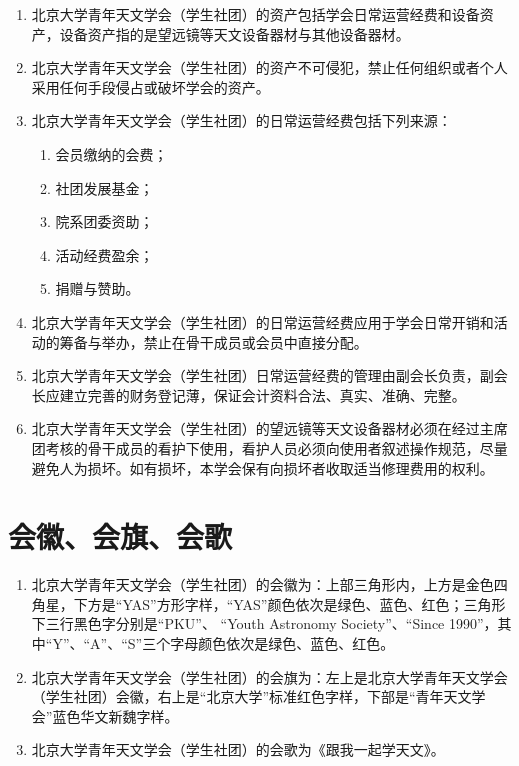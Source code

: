 \begin{enumerate}[resume]
    \item 北京大学青年天文学会（学生社团）的资产包括学会日常运营经费和设备资产，设备资产指的是望远镜等天文设备器材与其他设备器材。
    
    \item 北京大学青年天文学会（学生社团）的资产不可侵犯，禁止任何组织或者个人采用任何手段侵占或破坏学会的资产。
    
    \item 北京大学青年天文学会（学生社团）的日常运营经费包括下列来源：
    
    \begin{enumerate}
        \item 会员缴纳的会费；
        \item 社团发展基金；
        \item 院系团委资助；
        \item 活动经费盈余；
        \item 捐赠与赞助。
    \end{enumerate}
    
    \item 北京大学青年天文学会（学生社团）的日常运营经费应用于学会日常开销和活动的筹备与举办，禁止在骨干成员或会员中直接分配。
    
    \item 北京大学青年天文学会（学生社团）日常运营经费的管理由副会长负责，副会长应建立完善的财务登记薄，保证会计资料合法、真实、准确、完整。
    
    \item 北京大学青年天文学会（学生社团）的望远镜等天文设备器材必须在经过主席团考核的骨干成员的看护下使用，看护人员必须向使用者叙述操作规范，尽量避免人为损坏。如有损坏，本学会保有向损坏者收取适当修理费用的权利。
\end{enumerate}

\section{会徽、会旗、会歌}

\begin{enumerate}[resume]
    \item 北京大学青年天文学会（学生社团）的会徽为：上部三角形内，上方是金色四角星，下方是“YAS”方形字样，“YAS”颜色依次是绿色、蓝色、红色；三角形下三行黑色字分别是“PKU”、 “Youth Astronomy Society”、“Since 1990”，其中“Y”、“A”、“S”三个字母颜色依次是绿色、蓝色、红色。
    
    \item 北京大学青年天文学会（学生社团）的会旗为：左上是北京大学青年天文学会（学生社团）会徽，右上是“北京大学”标准红色字样，下部是“青年天文学会”蓝色华文新魏字样。
    
    \item 北京大学青年天文学会（学生社团）的会歌为《跟我一起学天文》。
\end{enumerate}

